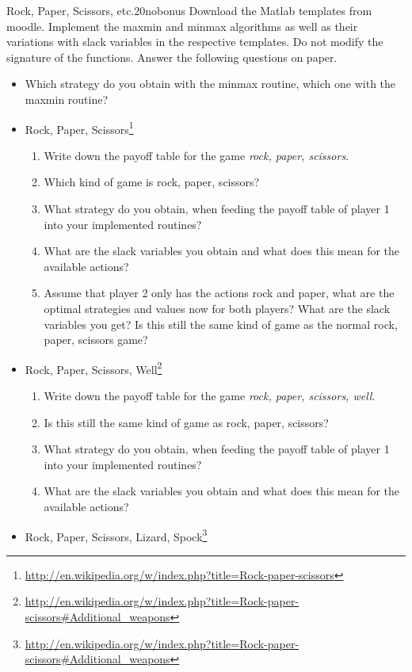 \documentclass[twoside,english,colorbacktitle,accentcolor=tud9c,10pt]{tudexercise}
\begin{document}
\begin{questions}

\begin{question}{Rock, Paper, Scissors, etc.}{20}{nobonus}
	Download the Matlab templates from moodle. Implement the maxmin and minmax algorithms as well as their variations with slack variables in the respective templates. Do not modify the signature of the functions. Answer the following questions on paper.
	\begin{itemize}
		\item Which strategy do you obtain with the minmax routine, which one with the maxmin routine?
		\item Rock, Paper, Scissors\footnote{\url{http://en.wikipedia.org/w/index.php?title=Rock-paper-scissors}}
		\begin{enumerate}
			\item Write down the payoff table for the game \emph{rock, paper, scissors}.
			\item Which kind of game is rock, paper, scissors?
			\item What strategy do you obtain, when feeding the payoff table of player 1 into your implemented routines?
			\item What are the slack variables you obtain and what does this mean for the available actions?
			\item Assume that player 2 only has the actions rock and paper, what are the optimal strategies and values now for both players? What are the slack variables you get? Is this still the same kind of game as the normal rock, paper, scissors game?
		\end{enumerate}
		\item Rock, Paper, Scissors, Well\footnote{\url{http://en.wikipedia.org/w/index.php?title=Rock-paper-scissors\#Additional\_weapons}}
		\begin{enumerate}
			\item Write down the payoff table for the game \emph{rock, paper, scissors, well}.
			\item Is this still the same kind of game as rock, paper, scissors?
			\item What strategy do you obtain, when feeding the payoff table of player 1 into your implemented routines?
			\item What are the slack variables you obtain and what does this mean for the available actions?
		\end{enumerate}
		\item Rock, Paper, Scissors, Lizard, Spock\footnote{\url{http://en.wikipedia.org/w/index.php?title=Rock-paper-scissors\#Additional\_weapons}}

\end{itemize}
\end{question}
\end{questions}
\end{document}
